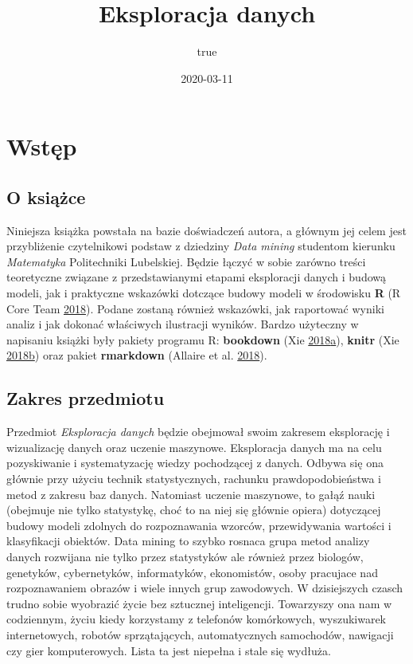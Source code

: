\documentclass[
]{book}
\title{Eksploracja danych}
\author{true}
\date{2020-03-11}
\theoremstyle{plain}
\theoremstyle{definition}
\theoremstyle{definition}
\theoremstyle{definition}
\theoremstyle{definition}
\theoremstyle{remark}
\begin{document}
\maketitle

{
\setcounter{tocdepth}{1}
\tableofcontents
}
\hypertarget{wstux119p}{%
\chapter*{Wstęp}\label{wstux119p}}

\hypertarget{o-ksiux105ux17cce}{%
\section*{O książce}\label{o-ksiux105ux17cce}}

Niniejsza książka powstała na bazie doświadczeń autora, a głównym jej celem jest przybliżenie czytelnikowi podstaw z dziedziny \emph{Data mining} studentom kierunku \emph{Matematyka} Politechniki Lubelskiej. Będzie łączyć w sobie zarówno treści teoretyczne związane z przedstawianymi etapami eksploracji danych i budową modeli, jak i praktyczne wskazówki dotczące budowy modeli w środowisku \textbf{R} (R Core Team \protect\hyperlink{ref-R-base}{2018}). Podane zostaną również wskazówki, jak raportować wyniki analiz i jak dokonać właściwych ilustracji wyników. Bardzo użyteczny w napisaniu książki były pakiety programu R: \textbf{bookdown} (Xie \protect\hyperlink{ref-R-bookdown}{2018}\protect\hyperlink{ref-R-bookdown}{a}), \textbf{knitr} (Xie \protect\hyperlink{ref-R-knitr}{2018}\protect\hyperlink{ref-R-knitr}{b}) oraz pakiet \textbf{rmarkdown} (Allaire et al. \protect\hyperlink{ref-R-rmarkdown}{2018}).

\hypertarget{zakres-przedmiotu}{%
\section*{Zakres przedmiotu}\label{zakres-przedmiotu}}

Przedmiot \emph{Eksploracja danych} będzie obejmował swoim zakresem eksplorację i wizualizację danych oraz uczenie maszynowe. Eksploracja danych ma na celu pozyskiwanie i systematyzację wiedzy pochodzącej z danych. Odbywa się ona głównie przy użyciu technik statystycznych, rachunku prawdopodobieństwa i metod z zakresu baz danych. Natomiast uczenie maszynowe, to gałąź nauki (obejmuje nie tylko statystykę, choć to na niej się głównie opiera) dotyczącej budowy modeli zdolnych do rozpoznawania wzorców, przewidywania wartości i klasyfikacji obiektów. Data mining to szybko rosnaca grupa metod analizy danych rozwijana nie tylko przez statystyków ale również przez biologów, genetyków, cybernetyków, informatyków, ekonomistów, osoby pracujace nad rozpoznawaniem obrazów i wiele innych grup zawodowych. W dzisiejszych czasch trudno sobie wyobrazić życie bez sztucznej inteligencji. Towarzyszy ona nam w codziennym, życiu kiedy korzystamy z telefonów komórkowych, wyszukiwarek internetowych, robotów sprzątających, automatycznych samochodów, nawigacji czy gier komputerowych. Lista ta jest niepełna i stale się wydłuża.
\end{document}
